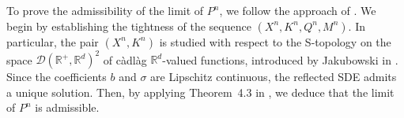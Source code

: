 \documentclass[11pt,amsfonts]{article}
\theoremstyle{plain}
\newtheorem{theorem}{Theorem}
\theoremstyle{assumpstyle}
\numberwithin{equation}{section}
\numberwithin{theorem}{section}
\numberwithin{proposition}{section}
\numberwithin{definition}{section}
\numberwithin{remark}{section}
\numberwithin{corollary}{section}
\numberwithin{lemma}{section}
\begin{document}
To prove the admissibility of the limit of $P^n$, we follow the approach of \cite{Lauka,lauka1}. 
We begin by establishing the tightness of the sequence $(X^n, K^n, Q^n, M^n)$. 
In particular, the pair $(X^n, K^n)$ is studied with respect to the S-topology on the space 
$\mathcal{D}(\mathbb{R}^+, \mathbb{R}^d)^2$ of càdlàg $\mathbb{R}^d$-valued functions, 
introduced by Jakubowski in \cite{jakub}. 
Since the coefficients $b$ and $\sigma$ are Lipschitz continuous, the reflected SDE admits a unique solution. 
Then, by applying Theorem~4.3 in \cite{Lauka}, we deduce that the limit of $P^n$ is admissible.

    
    
    
\end{document}
